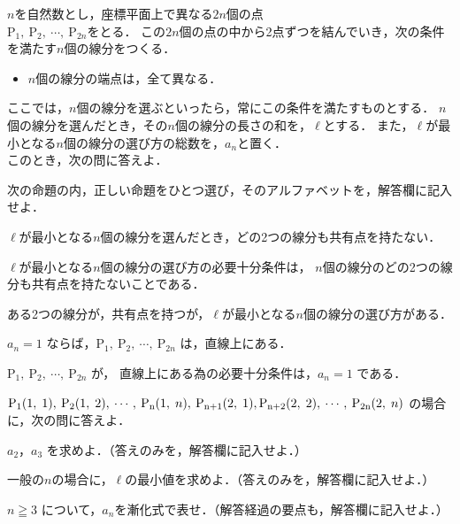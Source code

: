 \documentclass[../../../uem_mei_q.tex]{subfiles}
\begin{document}
    $n$を自然数とし，座標平面上で異なる$2n$個の点\\
    $\mathrm{P}_1,\:\mathrm{P}_2,\:\cdots,\:\mathrm{P}_{2n}$をとる．%
    この$2n$個の点の中から2点ずつを結んでいき，次の条件を満たす$n$個の線分をつくる．
    
    \begin{itemize}[leftmargin=5\zw, labelsep=.7\zw, topsep=4pt]
        \item[（条件）] $n$個の線分の端点は，全て異なる．
    \end{itemize}
    ここでは，$n$個の線分を選ぶといったら，常にこの条件を満たすものとする．%
    $n$個の線分を選んだとき，その$n$個の線分の長さの和を，$\ell$とする．%
    また，$\ell$が最小となる$n$個の線分の選び方の総数を，$a_n$と置く．\\
    このとき，次の問に答えよ．

    \begin{myenuc}
        \item 次の命題の内，正しい命題をひとつ選び，そのアルファベットを，解答欄に記入せよ．
        
        \begin{myenua}[label=\Alph*., leftmargin=2\zw]
            \item $\ell$が最小となる$n$個の線分を選んだとき，どの2つの線分も共有点を持たない．
            \item $\ell$が最小となる$n$個の線分の選び方の必要十分条件は，%
                $n$個の線分のどの2つの線分も共有点を持たないことである．
            \item ある2つの線分が，共有点を持つが，$\ell$が最小となる$n$個の線分の選び方がある．
            \item $a_n=1$ ならば，$\mathrm{P}_1,\:\mathrm{P}_2,\:\cdots,\:\mathrm{P}_{2n}$ %
                は，直線上にある．
            \item $\mathrm{P}_1,\:\mathrm{P}_2,\:\cdots,\:\mathrm{P}_{2n}$ が，%
                直線上にある為の必要十分条件は，$a_n=1$ である．
        \end{myenua}
        \item $\mathrm{P_1}(1,\;1),\:\mathrm{P_2}(1,\;2),\:\cdots,\:\mathrm{P_n}(1,\;n),%
            \:\mathrm{P_{n+1}}(2,\;1),\\
            \mathrm{P_{n+2}}(2,\;2),%
            \:\cdots,\:\mathrm{P_{2n}}(2,\;n)$ の場合に，次の問に答えよ．
            \begin{myenud}
                \item $a_2$，$a_3$ を求めよ．（答えのみを，解答欄に記入せよ．）
                \item 一般の$n$の場合に，$\ell$の最小値を求めよ．（答えのみを，解答欄に記入せよ．）
                \item $n\geqq3$ について，$a_n$を漸化式で表せ．（解答経過の要点も，解答欄に記入せよ．）
            \end{myenud}
    \end{myenuc}
\end{document}
